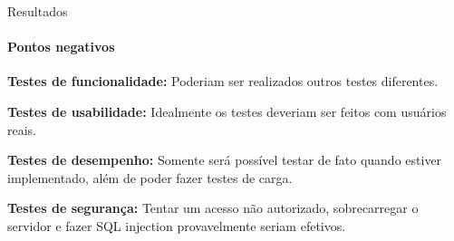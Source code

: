 \begin{frame}{Resultados}
    \framesubtitle{Pontos negativos}
    
    \textbf{Testes de funcionalidade:} Poderiam ser realizados outros testes diferentes.
    
    \vspace{\baselineskip}
    \textbf{Testes de usabilidade:} Idealmente os testes deveriam ser feitos com usuários reais.
    
    \vspace{\baselineskip}
    \textbf{Testes de desempenho:} Somente será possível testar de fato quando estiver implementado, além de poder fazer testes de carga.
    
    \vspace{\baselineskip}
    \textbf{Testes de segurança:} Tentar um acesso não autorizado, sobrecarregar o servidor e fazer SQL injection provavelmente seriam efetivos.
    
\end{frame}